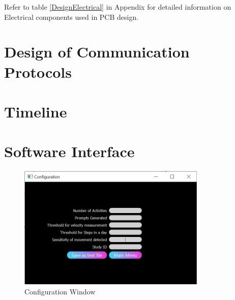 \documentclass[12pt, titlepage]{article}
\begin{document}
Refer to table \ref{DesignElectrical} in Appendix for detailed information on Electrical components used in PCB design.

\section{Design of Communication Protocols}


\section{Timeline}




% 

\newpage{}

\appendix

\section{Software Interface}
\label{Software_UI}
\begin{figure}[H]
	\begin{center}
		 \includegraphics[width=0.8\textwidth]{Config}
		\caption{Configuration Window}
		\label{Config} 
	\end{center}
\end{figure}
\end{document}
